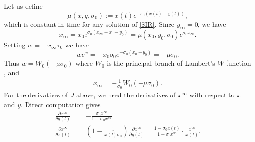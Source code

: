 \documentclass[english,12pt,letter]{article}
\newcommand{\Rnot}{\sigma_0}
\newcommand{\xinf}{x^\infty}
\begin{document}
Let us define
$$
   \mu(x,y,\Rnot) := x(t) e^{-\Rnot(x(t)+y(t))},
$$
which is constant in time for any solution of \eqref{SIR}.
Since $y_\infty=0$, we have
$$
    x_\infty = x_0 e^{\Rnot(x_\infty-x_0-y_0)} = \mu(x_0,y_0,\Rnot) e^{\Rnot x_\infty}.
$$
Setting $w=-x_\infty \Rnot$ we have
$$
    we^w = -x_0 \Rnot e^{-\Rnot(x_0+y_0)} = -\mu \Rnot.
$$
Thus $w = W_0(-\mu\Rnot)$ where $W_0$ is the principal branch of Lambert's $W$-function \cite{pakes2015lambert},
and
\begin{align} \label{eq:xinf}
    x_\infty = -\frac{1}{\Rnot}W_0(-\mu \Rnot).
\end{align}
For the derivatives of $J$ above, we need the derivatives of $\xinf$ with respect to $x$ and $y$.
Direct computation gives
\begin{subequations} \label{xinf-grad}
\begin{align}
    \frac{\partial \xinf}{\partial y(t)} & = -\frac{\Rnot \xinf}{1-\Rnot \xinf} \\
    \frac{\partial \xinf}{\partial x(t)} & = \left(1-\frac{1}{x(t)\Rnot}\right) \frac{\partial \xinf}{\partial y(t)}
      = \frac{1-\Rnot x(t)}{1-\Rnot \xinf} \cdot \frac{\xinf}{x(t)}.
\end{align}
\end{subequations}




\end{document}
